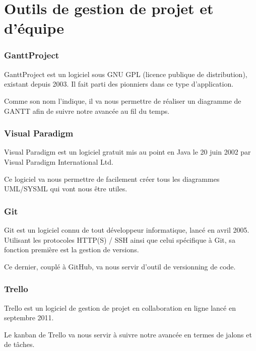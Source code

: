 \section{Outils de gestion de projet et d'équipe}
\label{Outils de gestion de projet et d’équipe}

\subsubsection*{GanttProject}
GanttProject est un logiciel sous GNU GPL (licence publique de distribution), existant depuis 2003. Il fait parti des pionniers dans ce type d’application.

Comme son nom l'indique, il va nous permettre de réaliser un diagramme de GANTT afin de suivre notre avancée au fil du temps.

\subsubsection*{Visual Paradigm}
Visual Paradigm est un logiciel gratuit mis au point en Java le 20 juin 2002 par Visual Paradigm International Ltd.

Ce logiciel va nous permettre de facilement créer tous les diagrammes UML/SYSML qui vont nous être utiles.

\subsubsection*{Git}
Git est un logiciel connu de tout développeur informatique, lancé en avril 2005. Utilisant les protocoles HTTP(S) / SSH ainsi que celui spécifique à Git, sa fonction première est la gestion de versions.

Ce dernier, couplé à GitHub, va nous servir d'outil de versionning de code.

\subsubsection*{Trello}
Trello est un logiciel de gestion de projet en collaboration en ligne lancé en septembre 2011.

Le kanban de Trello va nous servir à suivre notre avancée en termes de jalons et de tâches.
